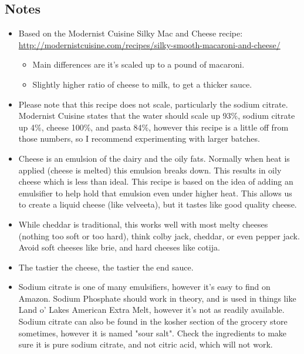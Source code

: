\begin{multicols}{2}
\subsection*{Notes}
\begin{itemize}
    \item Based on the Modernist Cuisine Silky Mac and Cheese recipe: \url{http://modernistcuisine.com/recipes/silky-smooth-macaroni-and-cheese/}
    \begin{itemize}
        \item Main differences are it's scaled up to a pound of macaroni.
        \item Slightly higher ratio of cheese to milk, to get a thicker sauce.
    \end{itemize}
    \item Please note that this recipe does not scale, particularly the sodium citrate. Modernist Cuisine states that the water should scale up 93\%, sodium citrate up 4\%, cheese 100\%, and pasta 84\%, however this recipe is a little off from those numbers, so I recommend experimenting with larger batches.
    \item Cheese is an emulsion of the dairy and the oily fats. Normally when heat is applied (cheese is melted) this emulsion breaks down. This results in oily cheese which is less than ideal. This recipe is based on the idea of adding an emulsifier to help hold that emulsion even under higher heat. This allows us to create a liquid cheese (like velveeta), but it tastes like good quality cheese.
    \item While cheddar is traditional, this works well with most melty cheeses (nothing too soft or too hard), think colby jack, cheddar, or even pepper jack. Avoid soft cheeses like brie, and hard cheeses like cotija.
    \item The tastier the cheese, the tastier the end sauce.
    \item Sodium citrate is one of many emulsifiers, however it's easy to find on Amazon. Sodium Phosphate should work in theory, and is used in things like Land o' Lakes American Extra Melt, however it's not as readily available. Sodium citrate can also be found in the kosher section of the grocery store sometimes, however it is named "sour salt". Check the ingredients to make sure it is pure sodium citrate, and not citric acid, which will not work.
\end{itemize}
\end{multicols}
\clearpage